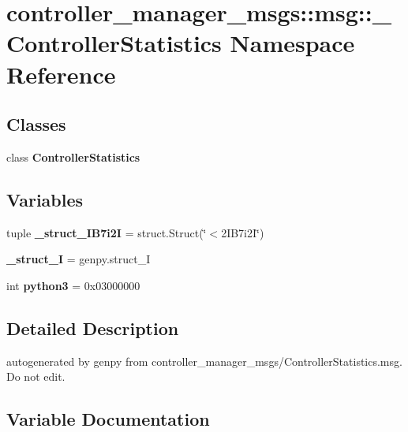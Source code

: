 \section{controller\-\_\-manager\-\_\-msgs\-:\-:msg\-:\-:\-\_\-\-Controller\-Statistics \-Namespace \-Reference}
\label{namespacecontroller__manager__msgs_1_1msg_1_1__ControllerStatistics}
\subsection*{\-Classes}
\begin{DoxyCompactItemize}
\item 
class {\bf \-Controller\-Statistics}
\end{DoxyCompactItemize}
\subsection*{\-Variables}
\begin{DoxyCompactItemize}
\item 
tuple {\bf \-\_\-struct\-\_\-I\-B7i2\-I} = struct.\-Struct(\char`\"{}$<$2\-I\-B7i2\-I\char`\"{})
\item 
{\bf \-\_\-struct\-\_\-\-I} = genpy.\-struct\-\_\-\-I
\item 
int {\bf python3} = 0x03000000
\end{DoxyCompactItemize}


\subsection{\-Detailed \-Description}
\begin{DoxyVerb}autogenerated by genpy from controller_manager_msgs/ControllerStatistics.msg. Do not edit.\end{DoxyVerb}
 

\subsection{\-Variable \-Documentation}
